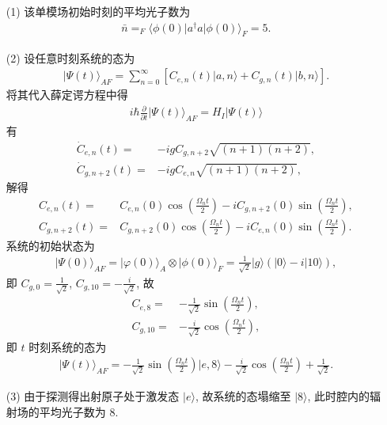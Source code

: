 \documentclass{assignment}
\begin{document}
\begin{sol}
    \begin{itemize}
        \item[(1)] 该单模场初始时刻的平均光子数为
        \begin{align}
            \bar{n}=_F\langle\phi(0)\rvert a^{\dagger}a\lvert\phi(0)\rangle_F=5.
        \end{align}
        \item[(2)] 设任意时刻系统的态为
        \begin{align}
            \lvert\Psi(t)\rangle_{AF}=\sum_{n=0}^{\infty}[C_{e,n}(t)\lvert a,n\rangle+C_{g,n}(t)\lvert b,n\rangle].
        \end{align}
        将其代入薛定谔方程中得
        \begin{align}
            i\hbar\frac{\partial}{\partial t}\lvert\Psi(t)\rangle_{AF}=H_I\lvert\Psi(t)\rangle
        \end{align}
        有
        \begin{align}
            \dot{C}_{e,n}(t)=&-igC_{g,n+2}\sqrt{(n+1)(n+2)},\\
            \dot{C}_{g,n+2}(t)=&-igC_{e,n}\sqrt{(n+1)(n+2)},
        \end{align}
        解得
        \begin{align}
            C_{e,n}(t)=&C_{e,n}(0)\cos\left(\frac{\Omega_nt}{2}\right)-iC_{g,n+2}(0)\sin\left(\frac{\Omega_nt}{2}\right),\\
            C_{g,n+2}(t)=&C_{g,n+2}(0)\cos\left(\frac{\Omega_nt}{2}\right)-iC_{e,n}(0)\sin\left(\frac{\Omega_nt}{2}\right).
        \end{align}
        系统的初始状态为
        \begin{align}
            \lvert\Psi(0)\rangle_{AF}=\lvert\varphi(0)\rangle_A\otimes\lvert\phi(0)\rangle_F=\frac{1}{\sqrt{2}}\lvert g\rangle(\lvert 0\rangle-i\lvert 10\rangle),
        \end{align}
        即 $C_{g,0}=\frac{1}{\sqrt{2}}$, $C_{g,10}=-\frac{i}{\sqrt{2}}$, 故
        \begin{align}
            C_{e,8}=&-\frac{1}{\sqrt{2}}\sin\left(\frac{\Omega_nt}{2}\right),\\
            C_{g,10}=&-\frac{i}{\sqrt{2}}\cos\left(\frac{\Omega_nt}{2}\right),
        \end{align}
        即 $t$ 时刻系统的态为
        \begin{align}
            \lvert\Psi(t)\rangle_{AF}=-\frac{1}{\sqrt{2}}\sin\left(\frac{\Omega_nt}{2}\right)\lvert e,8\rangle-\frac{i}{\sqrt{2}}\cos\left(\frac{\Omega_nt}{2}\right)+\frac{1}{\sqrt{2}}.
        \end{align}
        \item[(3)] 由于探测得出射原子处于激发态 $\lvert e\rangle$, 故系统的态塌缩至 $\lvert 8\rangle$, 此时腔内的辐射场的平均光子数为 $8$.
    \end{itemize}
\end{sol}
\end{document}

